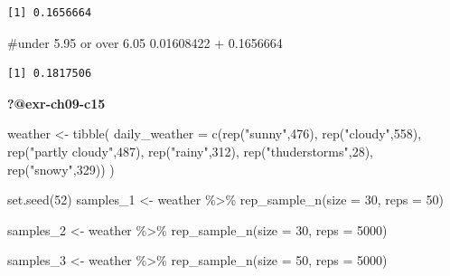\documentclass[
  letterpaper,
  DIV=11,
  numbers=noendperiod]{scrreprt}
\newenvironment{Shaded}{\begin{snugshade}}{\end{snugshade}}
\newcommand{\AttributeTok}[1]{\textcolor[rgb]{0.40,0.45,0.13}{#1}}
\newcommand{\CommentTok}[1]{\textcolor[rgb]{0.37,0.37,0.37}{#1}}
\newcommand{\DecValTok}[1]{\textcolor[rgb]{0.68,0.00,0.00}{#1}}
\newcommand{\FloatTok}[1]{\textcolor[rgb]{0.68,0.00,0.00}{#1}}
\newcommand{\FunctionTok}[1]{\textcolor[rgb]{0.28,0.35,0.67}{#1}}
\newcommand{\NormalTok}[1]{\textcolor[rgb]{0.00,0.23,0.31}{#1}}
\newcommand{\OtherTok}[1]{\textcolor[rgb]{0.00,0.23,0.31}{#1}}
\newcommand{\SpecialCharTok}[1]{\textcolor[rgb]{0.37,0.37,0.37}{#1}}
\newcommand{\StringTok}[1]{\textcolor[rgb]{0.13,0.47,0.30}{#1}}
\theoremstyle{definition}
\theoremstyle{remark}
\begin{document}
\begin{verbatim}
[1] 0.1656664
\end{verbatim}

\begin{Shaded}
\begin{Highlighting}[]
\CommentTok{\#under 5.95 or over 6.05}
\FloatTok{0.01608422} \SpecialCharTok{+} \FloatTok{0.1656664}
\end{Highlighting}
\end{Shaded}

\begin{verbatim}
[1] 0.1817506
\end{verbatim}

\textbf{?@exr-ch09-c15}

\begin{Shaded}
\begin{Highlighting}[]
\NormalTok{weather }\OtherTok{\textless{}{-}} \FunctionTok{tibble}\NormalTok{(}
  \AttributeTok{daily\_weather =} \FunctionTok{c}\NormalTok{(}\FunctionTok{rep}\NormalTok{(}\StringTok{"sunny"}\NormalTok{,}\DecValTok{476}\NormalTok{), }
                    \FunctionTok{rep}\NormalTok{(}\StringTok{"cloudy"}\NormalTok{,}\DecValTok{558}\NormalTok{), }
                    \FunctionTok{rep}\NormalTok{(}\StringTok{"partly cloudy"}\NormalTok{,}\DecValTok{487}\NormalTok{), }
                    \FunctionTok{rep}\NormalTok{(}\StringTok{"rainy"}\NormalTok{,}\DecValTok{312}\NormalTok{), }
                    \FunctionTok{rep}\NormalTok{(}\StringTok{"thuderstorms"}\NormalTok{,}\DecValTok{28}\NormalTok{), }
                    \FunctionTok{rep}\NormalTok{(}\StringTok{"snowy"}\NormalTok{,}\DecValTok{329}\NormalTok{))}
\NormalTok{  )}
\end{Highlighting}
\end{Shaded}

\begin{Shaded}
\begin{Highlighting}[]
\FunctionTok{set.seed}\NormalTok{(}\DecValTok{52}\NormalTok{)}
\NormalTok{samples\_1 }\OtherTok{\textless{}{-}}\NormalTok{ weather }\SpecialCharTok{\%\textgreater{}\%} 
  \FunctionTok{rep\_sample\_n}\NormalTok{(}\AttributeTok{size =} \DecValTok{30}\NormalTok{, }\AttributeTok{reps =} \DecValTok{50}\NormalTok{)}

\NormalTok{samples\_2 }\OtherTok{\textless{}{-}}\NormalTok{ weather }\SpecialCharTok{\%\textgreater{}\%} 
  \FunctionTok{rep\_sample\_n}\NormalTok{(}\AttributeTok{size =} \DecValTok{30}\NormalTok{, }\AttributeTok{reps =} \DecValTok{5000}\NormalTok{)}

\NormalTok{samples\_3 }\OtherTok{\textless{}{-}}\NormalTok{ weather }\SpecialCharTok{\%\textgreater{}\%} 
  \FunctionTok{rep\_sample\_n}\NormalTok{(}\AttributeTok{size =} \DecValTok{50}\NormalTok{, }\AttributeTok{reps =} \DecValTok{5000}\NormalTok{)}
\end{Highlighting}
\end{Shaded}
\end{document}

